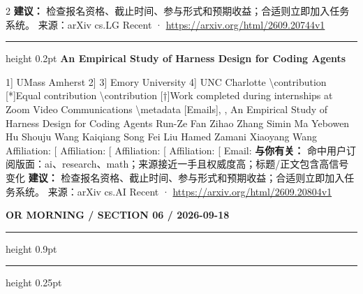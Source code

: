 \documentclass[10.5pt]{ctexart}
\begin{document}
\begin{multicols}{2}
\textbf{建议：} 检查报名资格、截止时间、参与形式和预期收益；合适则立即加入任务系统。
{\footnotesize\color{ormuted} 来源：arXiv cs.LG Recent · \url{https://arxiv.org/html/2609.20744v1}}
\vspace{2mm}
\hrule height 0.2pt
\vspace{2mm}
{\large\bfseries An Empirical Study of Harness Design for Coding Agents}\par
1] UMass Amherst 2] 3] Emory University 4] UNC Charlotte \textbackslash{}contribution [*]Equal contribution \textbackslash{}contribution [†]Work completed during internships at Zoom Video Communications \textbackslash{}metadata [Emails], , An Empirical Study of Harness Design for Coding Agents Run-Ze Fan Zihao Zhang Simin Ma Yebowen Hu Shouju Wang Kaiqiang Song Fei Liu Hamed Zamani Xiaoyang Wang Affiliation: [ Affiliation: [ Affiliation: [ Affiliation: [ Email:
\textbf{与你有关：} 命中用户订阅版面：ai、research、math；来源接近一手且权威度高；标题/正文包含高信号变化
\textbf{建议：} 检查报名资格、截止时间、参与形式和预期收益；合适则立即加入任务系统。
{\footnotesize\color{ormuted} 来源：arXiv cs.AI Recent · \url{https://arxiv.org/html/2609.20804v1}}
\end{multicols}
\newpage
{\small\bfseries OR MORNING / SECTION 06 / 2026-09-18}
\vspace{2mm}
\hrule height 0.9pt
\vspace{1.5mm}
\hrule height 0.25pt
\vspace{4mm}
\end{document}
